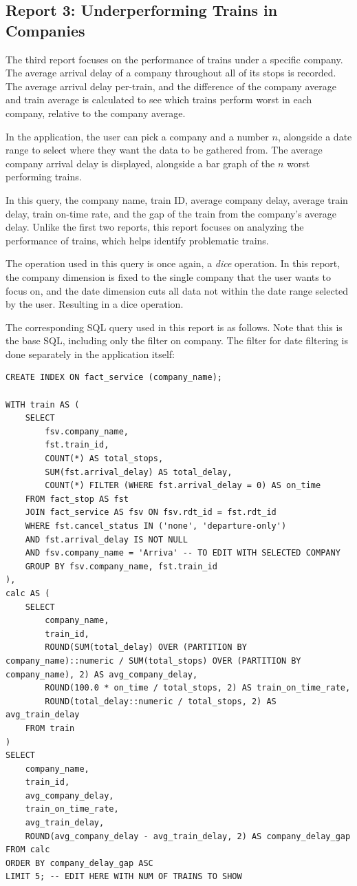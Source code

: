 \subsection{Report 3: Underperforming Trains in Companies}
\label{subsubsec:underperforming_trains}
The third report focuses on the performance of trains under a specific company. The average arrival delay of a company throughout all of its stops is recorded. The average arrival delay per-train, and the difference of the company average and train average is calculated to see which trains perform worst in each company, relative to the company average.

In the application, the user can pick a company and a number $n$, alongside a date range to select where they want the data to be gathered from. The average company arrival delay is displayed, alongside a bar graph of the $n$ worst performing trains. 

In this query, the company name, train ID, average company delay, average train delay, train on-time rate, and the gap of the train from the company's average delay. Unlike the first two reports, this report focuses on analyzing the performance of trains, which helps identify problematic trains.

The operation used in this query is once again, a \emph{dice} operation. In this report, the company dimension is fixed to the single company that the user wants to focus on, and the date dimension cuts all data not within the date range selected by the user. Resulting in a dice operation.

The corresponding SQL query used in this report is as follows. Note that this is the base SQL, including only the filter on company. The filter for date filtering is done separately in the application itself:

\begin{lstlisting}
CREATE INDEX ON fact_service (company_name);

WITH train AS (
    SELECT
        fsv.company_name,
        fst.train_id,
        COUNT(*) AS total_stops,
        SUM(fst.arrival_delay) AS total_delay,
        COUNT(*) FILTER (WHERE fst.arrival_delay = 0) AS on_time
    FROM fact_stop AS fst
    JOIN fact_service AS fsv ON fsv.rdt_id = fst.rdt_id
    WHERE fst.cancel_status IN ('none', 'departure-only')
    AND fst.arrival_delay IS NOT NULL
    AND fsv.company_name = 'Arriva' -- TO EDIT WITH SELECTED COMPANY
    GROUP BY fsv.company_name, fst.train_id
),
calc AS (
    SELECT
        company_name,
        train_id,
        ROUND(SUM(total_delay) OVER (PARTITION BY company_name)::numeric / SUM(total_stops) OVER (PARTITION BY company_name), 2) AS avg_company_delay,
        ROUND(100.0 * on_time / total_stops, 2) AS train_on_time_rate,
        ROUND(total_delay::numeric / total_stops, 2) AS avg_train_delay
    FROM train
)
SELECT
    company_name,
    train_id,
    avg_company_delay,
    train_on_time_rate,
    avg_train_delay,
    ROUND(avg_company_delay - avg_train_delay, 2) AS company_delay_gap
FROM calc
ORDER BY company_delay_gap ASC
LIMIT 5; -- EDIT HERE WITH NUM OF TRAINS TO SHOW
\end{lstlisting}

